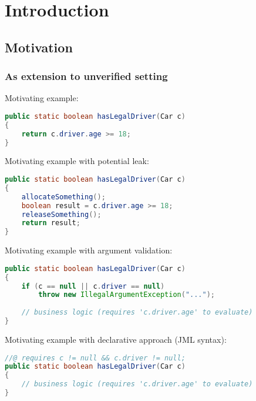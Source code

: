 \chapter{Introduction}

\section{Motivation}
\subsection{As extension to unverified setting}

\lstset{
    basicstyle=\ttfamily
    }

Motivating example:
\begin{lstlisting}[frame=single, language=Java]
public static boolean hasLegalDriver(Car c)
{
    return c.driver.age >= 18;
}
\end{lstlisting}

Motivating example with potential leak:
\begin{lstlisting}[frame=single, language=Java]
public static boolean hasLegalDriver(Car c)
{
    allocateSomething();
    boolean result = c.driver.age >= 18;
    releaseSomething();
    return result;
}
\end{lstlisting}

Motivating example with argument validation:
\begin{lstlisting}[frame=single, language=Java]
public static boolean hasLegalDriver(Car c)
{
    if (c == null || c.driver == null)
        throw new IllegalArgumentException("...");
        
    // business logic (requires 'c.driver.age' to evaluate)
}
\end{lstlisting}

Motivating example with declarative approach (JML syntax):
\begin{lstlisting}[frame=single, language=Java]
//@ requires c != null && c.driver != null;
public static boolean hasLegalDriver(Car c)
{
    // business logic (requires 'c.driver.age' to evaluate)
}
\end{lstlisting}

